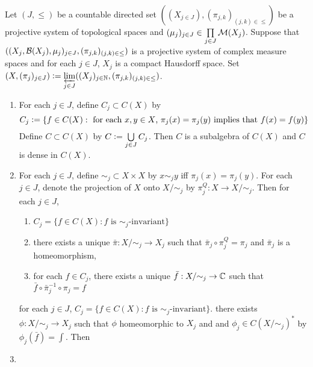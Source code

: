 \documentclass{book}
\begin{document}
\begin{ex} 
	Let $(J, {\leq})$ be a countable directed set $((X_{j \in J}), (\pi_{j,k})_{(j,k) \in \leq})$ be a projective system of topological spaces and $(\mu_j)_{j \in J} \in \prod\limits_{j \in J} \mathcal{M}(X_j)$. Suppose that $((X_j, \mathcal{B}(X_j), \mu_j)_{j \in J}, (\pi_{j,k})_{(j,k) \in {\leq}})$ is a projective system of complex measure spaces and for each $j \in J$, $X_j$ is a compact Hausdorff space. Set $(X, (\pi_j)_{j \in J}) \vcentcolon= \varprojlim\limits_{j \in J} ((X_j)_{j \in \mathbb{N}}, (\pi_{j,k})_{(j,k) \in {\leq}})$. 
	\begin{enumerate}
		\item For each $j \in J$, define $C_j \subset C(X)$ by 
		$$C_j \vcentcolon= \{f \in C(X): \text{ for each $x,y \in X$, $\pi_j(x) = \pi_j(y)$ implies that $f(x) = f(y)$}\}$$
		Define $C \subset C(X)$ by $C \vcentcolon= \bigcup\limits_{j \in J} C_j$. Then $C$ is a subalgebra of $C(X)$ and $C$ is dense in $C(X)$. 
		\item For each $j \in J$, define ${\sim_j}  \subset X \times X$ by $x \sim_j y$ iff $\pi_j(x) = \pi_j(y)$. For each $j \in J$, denote the projection of $X$ onto $X/{\sim_j}$ by $\pi^Q_j: X \rightarrow X/{\sim_j}$. Then for each $j \in J$,
		\begin{enumerate}
			\item $C_j = \{f \in C(X): \text{$f$ is $\sim_j$-invariant}\}$
			\item there exists a unique $\bar{\pi}:X/{\sim_j} \rightarrow X_j$ such that $\bar{\pi}_j \circ \pi^Q_j = \pi_j$ and $\bar{\pi}_j$ is a homeomorphism,
			\item for each $f \in C_j$, there exists a unique $\bar{f}:X/{\sim_j} \rightarrow \mathbb{C}$ such that $\bar{f} \circ \bar{\pi}_j^{-1} \circ \pi_j = f$
		\end{enumerate}
		for each $j \in J$, $C_j = \{f \in C(X): \text{$f$ is $\sim_j$-invariant}\}$. there exists $\phi: X / {\sim_j}  \rightarrow X_j$ such that $\phi$ homeomorphic to $X_j$ and and $\phi_j \in C(X/{\sim_j})^*$ by $\phi_j(\bar{f}) = \int$. Then 
		\item 
	\end{enumerate}
\end{ex}
\end{document}

